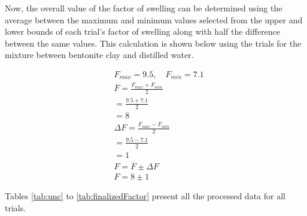 \documentclass[11pt, letterpaper]{article}
\begin{document}
Now, the overall value of the factor of swelling can be determined
using the average between the maximum and minimum values selected
from the upper and lower bounds of each trial's factor of swelling
along with half the difference between the same values.
This calculation is shown below using the trials for the mixture
between bentonite clay and distilled water.

\begin{align*}
     & F_{max} = 9.5,\quad F_{min} = 7.1
    \\
     & \overline{F} = \frac{F_{max} + F_{min}}{2}
    \\
     & = \frac{9.5 + 7.1}{2}
    \\
     & = 8
    \\
     & \Delta F = \frac{F_{max} - F_{min}}{2}
    \\
     & = \frac{9.5 - 7.1}{2}
    \\
     & = 1
    \\
     & F = \overline{F} \pm \Delta F
    \\
     & F = 8 \pm 1
\end{align*}

Tables \ref*{tab:unc} to \ref*{tab:finalizedFactor} present all the processed data for all trials.
\end{document}
